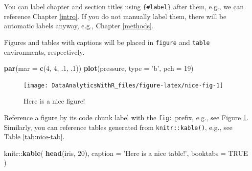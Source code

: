 \documentclass[]{book}
\newenvironment{Shaded}{\begin{snugshade}}{\end{snugshade}}
\newcommand{\KeywordTok}[1]{\textcolor[rgb]{0.13,0.29,0.53}{\textbf{{#1}}}}
\newcommand{\DataTypeTok}[1]{\textcolor[rgb]{0.13,0.29,0.53}{{#1}}}
\newcommand{\DecValTok}[1]{\textcolor[rgb]{0.00,0.00,0.81}{{#1}}}
\newcommand{\StringTok}[1]{\textcolor[rgb]{0.31,0.60,0.02}{{#1}}}
\newcommand{\OtherTok}[1]{\textcolor[rgb]{0.56,0.35,0.01}{{#1}}}
\newcommand{\NormalTok}[1]{{#1}}
\theoremstyle{definition}
\theoremstyle{definition}
\theoremstyle{remark}
\begin{document}
You can label chapter and section titles using \texttt{\{\#label\}}
after them, e.g., we can reference Chapter \ref{intro}. If you do not
manually label them, there will be automatic labels anyway, e.g.,
Chapter \ref{methods}.

Figures and tables with captions will be placed in \texttt{figure} and
\texttt{table} environments, respectively.

\begin{Shaded}
\begin{Highlighting}[]
\KeywordTok{par}\NormalTok{(}\DataTypeTok{mar =} \KeywordTok{c}\NormalTok{(}\DecValTok{4}\NormalTok{, }\DecValTok{4}\NormalTok{, .}\DecValTok{1}\NormalTok{, .}\DecValTok{1}\NormalTok{))}
\KeywordTok{plot}\NormalTok{(pressure, }\DataTypeTok{type =} \StringTok{'b'}\NormalTok{, }\DataTypeTok{pch =} \DecValTok{19}\NormalTok{)}
\end{Highlighting}
\end{Shaded}

\begin{figure}

{\centering \texttt{[image: DataAnalyticsWithR\_files/figure-latex/nice-fig-1]} 

}

\caption{Here is a nice figure!}\label{fig:nice-fig}
\end{figure}

Reference a figure by its code chunk label with the \texttt{fig:}
prefix, e.g., see Figure \ref{fig:nice-fig}. Similarly, you can
reference tables generated from \texttt{knitr::kable()}, e.g., see Table
\ref{tab:nice-tab}.

\begin{Shaded}
\begin{Highlighting}[]
\NormalTok{knitr::}\KeywordTok{kable}\NormalTok{(}
  \KeywordTok{head}\NormalTok{(iris, }\DecValTok{20}\NormalTok{), }\DataTypeTok{caption =} \StringTok{'Here is a nice table!'}\NormalTok{,}
  \DataTypeTok{booktabs =} \OtherTok{TRUE}
\NormalTok{)}
\end{Highlighting}
\end{Shaded}
\end{document}
